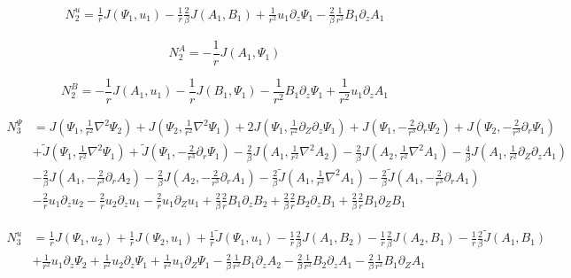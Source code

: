 \documentclass{emulateapj}
\newcommand{\beq}{\begin{equation}}
\newcommand{\eeq}{\end{equation}}
\begin{document}
\beq
\begin{split}
N_2^{u} = \frac{1}{r} J\left(\Psi_1, u_1\right) - \frac{1}{r} \frac{2}{\beta} J\left(A_1, B_1\right) + \frac{1}{r^2} u_1 \partial_z \Psi_1 - \frac{2}{\beta}\frac{1}{r^2} B_1 \partial_z A_1
\end{split}
\eeq

\beq
N_2^A = -\frac{1}{r} J\left(A_1, \Psi_1\right)
\eeq

\beq
N_2^B = -\frac{1}{r} J\left(A_1, u_1\right) - \frac{1}{r} J\left(B_1, \Psi_1\right) - \frac{1}{r^2} B_1 \partial_z \Psi_1 + \frac{1}{r^2} u_1 \partial_z A_1
\eeq

\beq
\begin{split}
N_3^{\Psi} & = J(\Psi_1, \frac{1}{r^2} \nabla^2 \Psi_2) + J(\Psi_2, \frac{1}{r^2} \nabla^2\Psi_1) + 2 J (\Psi_1, \frac{1}{r^2}\partial_Z\partial_z \Psi_1) + J(\Psi_1, -\frac{2}{r^3}\partial_r \Psi_2) + J(\Psi_2, -\frac{2}{r^3}\partial_r \Psi_1) \\
& + \widetilde{J}(\Psi_1, \frac{1}{r^2} \nabla^2 \Psi_1) + \widetilde{J} (\Psi_1, -\frac{2}{r^3}\partial_r \Psi_1) - \frac{2}{\beta} J(A_1, \frac{1}{r^2}\nabla^2 A_2) - \frac{2}{\beta} J(A_2, \frac{1}{r^2}\nabla^2 A_1) - \frac{4}{\beta} J(A_1, \frac{1}{r^2}\partial_Z\partial_z A_1) \\ & - \frac{2}{\beta} J(A_1, -\frac{2}{r^3} \partial_r A_2 ) 
 - \frac{2}{\beta} J(A_2, -\frac{2}{r^3} \partial_r A_1) - \frac{2}{\beta} \widetilde{J} (A_1, \frac{1}{r^2} \nabla^2 A_1) - \frac{2}{\beta} \widetilde{J} (A_1, -\frac{2}{r^3} \partial_r A_1) \\
& - \frac{2}{r} u_1 \partial_z u_2 - \frac{2}{r} u_2 \partial_z u_1 - \frac{2}{r} u_1 \partial_Z u_1 + \frac{2}{\beta}\frac{2}{r} B_1\partial_z B_2 + \frac{2}{\beta}\frac{2}{r} B_2 \partial_z B_1 + \frac{2}{\beta} \frac{2}{r} B_1 \partial_Z B_1
\end{split}
\eeq

\beq
\begin{split}
N_3^u & = \frac{1}{r}J\left(\Psi_1, u_2\right) + \frac{1}{r}J\left(\Psi_2, u_1\right) + \frac{1}{r}\widetilde{J} \left(\Psi_1, u_1\right) - \frac{1}{r}\frac{2}{\beta} J\left(A_1, B_2\right) - \frac{1}{r} \frac{2}{\beta} J\left(A_2, B_1\right) - \frac{1}{r}\frac{2}{\beta}\widetilde{J}\left(A_1, B_1\right) \\
& + \frac{1}{r^2} u_1\partial_z \Psi_2 + \frac{1}{r^2} u_2 \partial_z \Psi_1 + \frac{1}{r^2} u_1 \partial_Z \Psi_1 - \frac{2}{\beta} \frac{1}{r^2} B_1 \partial_z A_2 - \frac{2}{\beta} \frac{1}{r^2} B_2 \partial_z A_1 - \frac{2}{\beta} \frac{1}{r^2} B_1 \partial_Z A_1
\end{split}
\eeq
\end{document}

